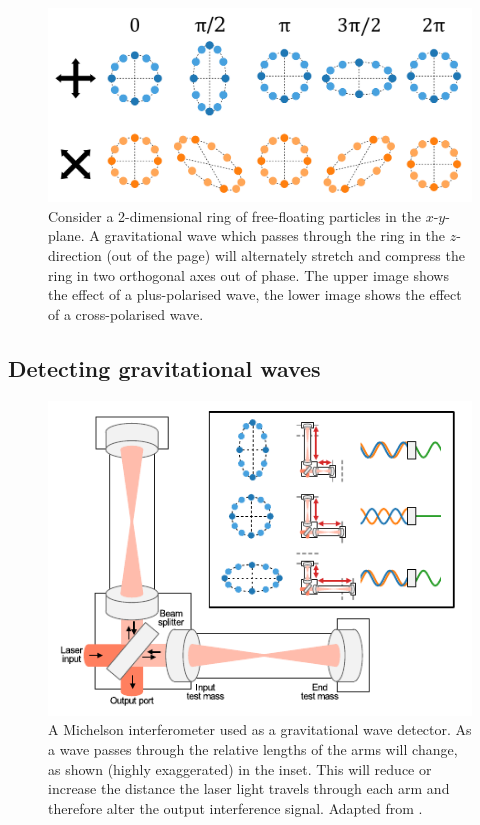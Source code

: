 \begin{colsection}
\begin{colsection}
\begin{figure}[p]
    \begin{center}
        \includegraphics[width=0.8\linewidth]{images/waveimg2.pdf}
    \end{center}
    \caption[Gravitational wave polarisations]{
        Consider a 2-dimensional ring of free-floating particles in the $x$-$y$-plane. A gravitational wave which passes through the ring in the $z$-direction (out of the page) will alternately stretch and compress the ring in two orthogonal axes out of phase. The upper image shows the effect of a plus-polarised wave, the lower image shows the effect of a cross-polarised wave.
        }\label{fig:wave}
\end{figure}

\end{colsection}


\subsection{Detecting gravitational waves}
\label{sec:gw_detecting}
\begin{colsection}

\begin{figure}[p]
    \begin{center}
        \includegraphics[width=0.75\linewidth]{images/detector.pdf}
    \end{center}
    \caption[A Michelson interferometer used as a gravitational wave detector]{
        A Michelson interferometer used as a gravitational wave detector. As a wave passes through the relative lengths of the arms will change, as shown (highly exaggerated) in the inset. This will reduce or increase the distance the laser light travels through each arm and therefore alter the output interference signal. Adapted from \citet{GW150914_detectors}.
        }\label{fig:detector}
\end{figure}


\end{colsection}
\end{colsection}
